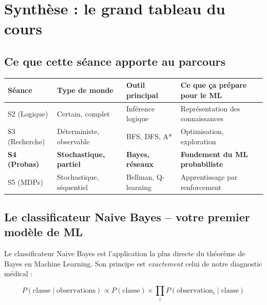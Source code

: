 \documentclass[11pt,a4paper]{article}
\begin{document}
\section{Synthèse : le grand tableau du cours}

\subsection{Ce que cette séance apporte au parcours}

\begin{center}
\begin{tabular}{lp{2.5cm}p{2.5cm}p{4cm}}
\toprule
\textbf{Séance} & \textbf{Type de monde} & \textbf{Outil principal} & \textbf{Ce que ça prépare pour le ML} \\
\midrule
S2 (Logique) & Certain, complet & Inférence logique & Représentation des connaissances \\
S3 (Recherche) & Déterministe, observable & BFS, DFS, A* & Optimisation, exploration \\
\textbf{S4 (Probas)} & \textbf{Stochastique, partiel} & \textbf{Bayes, réseaux} & \textbf{Fondement du ML probabiliste} \\
S5 (MDPs) & Stochastique, séquentiel & Bellman, Q-learning & Apprentissage par renforcement \\
\bottomrule
\end{tabular}
\end{center}

\subsection{Le classificateur Naive Bayes -- votre premier modèle de ML}

Le classificateur Naive Bayes est l'application la plus directe du théorème de Bayes en Machine Learning. Son principe est \textit{exactement} celui de notre diagnostic médical :

$$P(\text{classe} \mid \text{observations}) \propto P(\text{classe}) \times \prod_{i} P(\text{observation}_i \mid \text{classe})$$
\end{document}
